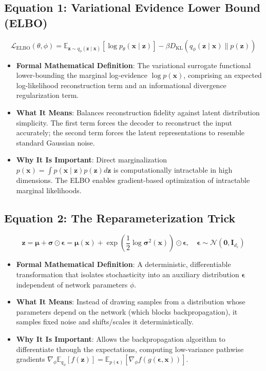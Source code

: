 \documentclass[11pt,a4paper]{article}
\theoremstyle{definition}
\begin{document}
\subsection{\textbf{Equation 1: Variational Evidence Lower Bound (ELBO)}}
{\boldmath
\begin{equation}
\mathcal{L}_{\text{ELBO}}(\theta, \phi) = \mathbb{E}_{\mathbf{z} \sim q_\phi(\mathbf{z} \mid \mathbf{x})}[\log p_\theta(\mathbf{x} \mid \mathbf{z})] - \beta D_{\text{KL}}(q_\phi(\mathbf{z} \mid \mathbf{x}) \parallel p(\mathbf{z}))
\end{equation}
}
\begin{itemize}
    \item \textbf{Formal Mathematical Definition}:
    The variational surrogate functional lower-bounding the marginal log-evidence $\log p(\mathbf{x})$, comprising an expected log-likelihood reconstruction term and an informational divergence regularization term.
    \item \textbf{What It Means}:
    Balances reconstruction fidelity against latent distribution simplicity. The first term forces the decoder to reconstruct the input accurately; the second term forces the latent representations to resemble standard Gaussian noise.
    \item \textbf{Why It Is Important}:
    Direct marginalization $p(\mathbf{x}) = \int p(\mathbf{x} \mid \mathbf{z}) p(\mathbf{z}) d\mathbf{z}$ is computationally intractable in high dimensions. The ELBO enables gradient-based optimization of intractable marginal likelihoods.
\end{itemize}

\subsection{\textbf{Equation 2: The Reparameterization Trick}}
{\boldmath
\begin{equation}
\mathbf{z} = \boldsymbol{\mu} + \boldsymbol{\sigma} \odot \boldsymbol{\epsilon} = \boldsymbol{\mu}(\mathbf{x}) + \exp\left(\frac{1}{2}\log \boldsymbol{\sigma}^2(\mathbf{x})\right) \odot \boldsymbol{\epsilon}, \quad \boldsymbol{\epsilon} \sim \mathcal{N}(\mathbf{0}, \mathbf{I}_{d_z})
\end{equation}
}
\begin{itemize}
    \item \textbf{Formal Mathematical Definition}:
    A deterministic, differentiable transformation that isolates stochasticity into an auxiliary distribution $\boldsymbol{\epsilon}$ independent of network parameters $\phi$.
    \item \textbf{What It Means}:
    Instead of drawing samples from a distribution whose parameters depend on the network (which blocks backpropagation), it samples fixed noise and shifts/scales it deterministically.
    \item \textbf{Why It Is Important}:
    Allows the backpropagation algorithm to differentiate through the expectations, computing low-variance pathwise gradients $\nabla_\phi \mathbb{E}_{q_\phi}[f(\mathbf{z})] = \mathbb{E}_{p(\boldsymbol{\epsilon})}[\nabla_\phi f(g(\boldsymbol{\epsilon}, \mathbf{x}))]$.
\end{itemize}
\end{document}
